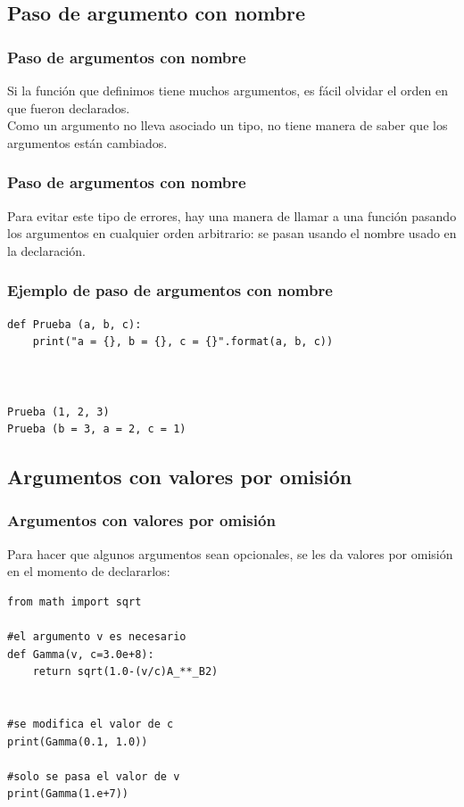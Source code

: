 \subsection{Paso de argumento con nombre}
\begin{frame}
\frametitle{Paso de argumentos con nombre}
Si la función que definimos tiene muchos argumentos, es fácil olvidar el orden en que fueron declarados.
\\
\medskip
Como un argumento no lleva asociado un tipo, \python{} no tiene manera de saber que los argumentos están cambiados.
\end{frame}
\begin{frame}
\frametitle{Paso de argumentos con nombre}
Para evitar este tipo de errores, hay una manera de llamar a una función pasando los argumentos en cualquier orden arbitrario: se pasan usando el nombre usado en la declaración.
\end{frame}
\begin{frame}[fragile]
\frametitle{Ejemplo de paso de argumentos con nombre}
\begin{lstlisting}[style=codigopython]
def Prueba (a, b, c):
    print("a = {}, b = {}, c = {}".format(a, b, c))



Prueba (1, 2, 3)
Prueba (b = 3, a = 2, c = 1)
\end{lstlisting}
\end{frame}
\subsection{Argumentos con valores por omisión}
\begin{frame}
\frametitle{Argumentos con valores por omisión}
Para hacer que algunos argumentos sean opcionales, se les da valores por omisión en el momento de declararlos:
\begin{lstlisting}[style=codigopython]
from math import sqrt

#el argumento v es necesario
def Gamma(v, c=3.0e+8):
    return sqrt(1.0-(v/c)A_**_B2)


#se modifica el valor de c
print(Gamma(0.1, 1.0))

#solo se pasa el valor de v
print(Gamma(1.e+7))
\end{lstlisting}
\end{frame}
